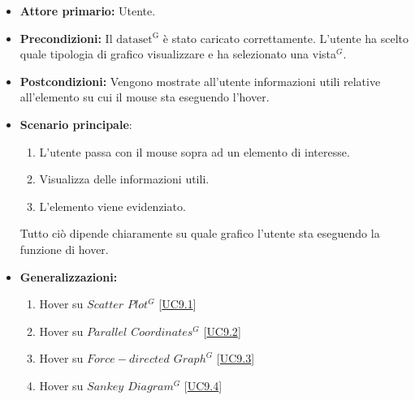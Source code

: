 \begin{itemize}
    \item \textbf{Attore primario:} Utente.
    \item \textbf{Precondizioni:} Il ${\mathrm{dataset^{G}}}$ è stato caricato correttamente. L'utente ha scelto quale tipologia di grafico visualizzare e ha selezionato una vista$^{G}$.
    \item \textbf{Postcondizioni:} Vengono mostrate all'utente informazioni utili relative all'elemento su cui il mouse sta eseguendo l'hover.
    \item \textbf{Scenario principale}: 
    \begin{enumerate}
		\item L'utente passa con il mouse sopra ad un elemento di interesse. 
		\item Visualizza delle informazioni utili.
		\item L'elemento viene evidenziato. 
	\end{enumerate}
	Tutto ciò dipende chiaramente su quale grafico l'utente sta eseguendo la funzione di hover.
    \item \textbf{Generalizzazioni:} \begin{enumerate}
                                        \item Hover su \textit{$Scatter$ $Plot^{G}$} [\hyperref[sec:UC9.1]{UC9.1}]
                                        \item Hover su \textit{$Parallel$ $Coordinates^{G}$} [\hyperref[sec:UC9.2]{UC9.2}]
                                        \item Hover su \textit{$Force-directed$ $Graph^{G}$} [\hyperref[sec:UC9.3]{UC9.3}]
                                        \item Hover su \textit{$Sankey$ $Diagram^{G}$} [\hyperref[sec:UC9.4]{UC9.4}]
                                    \end{enumerate}
\end{itemize}

